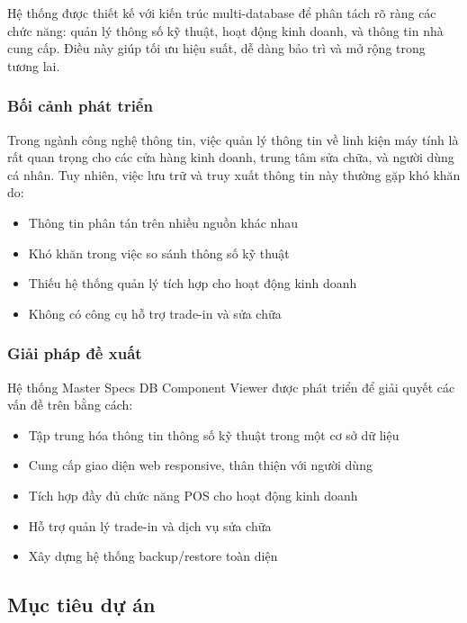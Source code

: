 \documentclass[12pt,a4paper]{article}
\begin{document}
Hệ thống được thiết kế với kiến trúc multi-database để phân tách rõ ràng các chức năng: quản lý thông số kỹ thuật, hoạt động kinh doanh, và thông tin nhà cung cấp. Điều này giúp tối ưu hiệu suất, dễ dàng bảo trì và mở rộng trong tương lai.

\subsubsection{Bối cảnh phát triển}
Trong ngành công nghệ thông tin, việc quản lý thông tin về linh kiện máy tính là rất quan trọng cho các cửa hàng kinh doanh, trung tâm sửa chữa, và người dùng cá nhân. Tuy nhiên, việc lưu trữ và truy xuất thông tin này thường gặp khó khăn do:
\begin{itemize}
    \item Thông tin phân tán trên nhiều nguồn khác nhau
    \item Khó khăn trong việc so sánh thông số kỹ thuật
    \item Thiếu hệ thống quản lý tích hợp cho hoạt động kinh doanh
    \item Không có công cụ hỗ trợ trade-in và sửa chữa
\end{itemize}

\subsubsection{Giải pháp đề xuất}
Hệ thống Master Specs DB Component Viewer được phát triển để giải quyết các vấn đề trên bằng cách:
\begin{itemize}
    \item Tập trung hóa thông tin thông số kỹ thuật trong một cơ sở dữ liệu
    \item Cung cấp giao diện web responsive, thân thiện với người dùng
    \item Tích hợp đầy đủ chức năng POS cho hoạt động kinh doanh
    \item Hỗ trợ quản lý trade-in và dịch vụ sửa chữa
    \item Xây dựng hệ thống backup/restore toàn diện
\end{itemize}

\subsection{Mục tiêu dự án}
\end{document}
